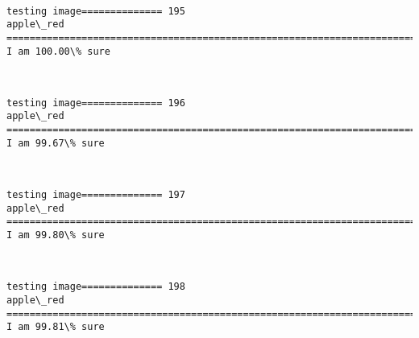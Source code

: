 \documentclass[11pt]{article}
\begin{document}
    \begin{center}
    \end{center}
    { \hspace*{\fill} \\}
    
    \begin{Verbatim}[commandchars=\\\{\}]
testing image============== 195
apple\_red
============================================================================
I am 100.00\% sure

    \end{Verbatim}

    \begin{center}
    \end{center}
    { \hspace*{\fill} \\}
    
    \begin{Verbatim}[commandchars=\\\{\}]
testing image============== 196
apple\_red
============================================================================
I am 99.67\% sure

    \end{Verbatim}

    \begin{center}
    \end{center}
    { \hspace*{\fill} \\}
    
    \begin{Verbatim}[commandchars=\\\{\}]
testing image============== 197
apple\_red
============================================================================
I am 99.80\% sure

    \end{Verbatim}

    \begin{center}
    \end{center}
    { \hspace*{\fill} \\}
    
    \begin{Verbatim}[commandchars=\\\{\}]
testing image============== 198
apple\_red
============================================================================
I am 99.81\% sure

    \end{Verbatim}
\end{document}
